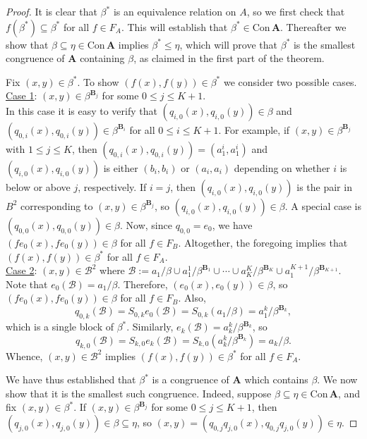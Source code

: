 \documentclass[cm,dissertation]{uhthesis}
\theoremstyle{plain}
\theoremstyle{definition}
\newcounter{claim}
\theoremstyle{remark}
\numberwithin{theorem}{section}
\numberwithin{claim}{chapter}
\numberwithin{equation}{section}
\numberwithin{conjecture}{chapter}
\newcommand{\<}{\ensuremath{\langle}}
\renewcommand{\>}{\ensuremath{\rangle}}
\renewcommand{\leq}{\ensuremath{\leqslant}}
\newcommand{\Con}{\ensuremath{\mathrm{Con\,}}}
\newcommand{\0}{\ensuremath{\mathbf{0}}}
\newcommand{\1}{\ensuremath{\mathbf{1}}}
\newcommand{\2}{\ensuremath{\mathbf{2}}}
\newcommand{\3}{\ensuremath{\mathbf{3}}}
\newcommand{\4}{\ensuremath{\mathbf{4}}}
\newcommand{\5}{\ensuremath{\mathbf{5}}}
\newcommand{\bA}{\ensuremath{\mathbf{A}}}
\newcommand{\bB}{\ensuremath{\mathbf{B}}}
\newcommand{\sB}{\ensuremath{\mathscr{B}}}
\begin{document}
\begin{proof}
  It is clear that $\beta^*$ is an equivalence relation on $A$, so we first
  check that $f(\beta^*)\subseteq 
  \beta^*$ for all $f\in F_A$.  This will establish that $\beta^*\in \Con\bA$.
  Thereafter we show that $\beta \subseteq \eta \in \Con\bA$ implies 
  $\beta^*\leq \eta$, which will prove that $\beta^*$ is the smallest congruence
  of $\bA$ containing $\beta$, as claimed in the first part of the theorem.

  Fix $(x,y) \in \beta^*$.  To show $(f(x), f(y)) \in \beta^*$ we consider two
  possible cases.
  \\[6pt]
  \underline{Case 1}: $(x,y)\in \beta^{\bB_j}$ for some $0\leq j \leq K+1$.\\[4pt]
  In this case it is easy to verify that $(q_{i,0}(x), q_{i,0}(y)) \in \beta$ and 
  $(q_{0,i}(x), q_{0,i}(y)) \in \beta^{\bB_i}$  for all $0\leq i \leq
  K+1$.  For example, if $(x,y)\in \beta^{\bB_j}$ with $1\leq j \leq K$, 
  then $(q_{0,i}(x), q_{0,i}(y))  = (a_1^i, a_1^i)$ %
  and $(q_{i,0}(x), q_{i,0}(y))$ is either $(b_i, b_i)$ or $(a_i,
  a_i)$ depending on whether $i$ is below or above $j$, respectively. If $i=j$,
  then $(q_{i,0}(x), q_{i,0}(y))$ is the pair in $B^2$ corresponding to
  $(x,y)\in \beta^{\bB_j}$, so $(q_{i,0}(x), q_{i,0}(y))\in \beta$.
  A special case is $(q_{0,0}(x), q_{0,0}(y)) \in \beta$.  Now, since 
  $q_{0,0} = e_0$, we have $(f e_{0}(x), f e_{0}(y))\in \beta$
  for all $f\in F_B$.
  Altogether, the foregoing implies that $(f(x),f(y))\in \beta^*$
  for all $f\in F_A$.
  \\[6pt]
  \underline{Case 2}: $(x,y)\in \sB^2$ where 
  $\sB := a_1/\beta \cup a_1^1/\beta^{\bB_1} \cup \cdots \cup a_K^K/\beta^{\bB_K}\cup a_1^{K+1}/\beta^{\bB_{K+1}}$.
  \\[4pt]
  Note that  $e_0(\sB) = a_1/\beta$. Therefore, 
  $(e_0(x),e_0(y)) \in  \beta$, so 
  $(fe_0(x),fe_0(y)) \in  \beta$ for all $f\in F_B$.  Also,
  \[
  q_{0,k}(\sB) = S_{0,k} e_0(\sB) = S_{0,k}(a_1/\beta) = 
  a_1^{k}/\beta^{\bB_{k}},
  \]
  which is a single block of $\beta^*$.
  Similarly,
  $e_k(\sB) = a_k^k/\beta^{\bB_k}$, so 
  \[
  q_{k,0}(\sB) = S_{k,0} e_k(\sB) = S_{k,0}(a_k^k/\beta^{\bB_k}) = a_k/\beta.
  \]
  Whence, $(x,y)\in \sB^2$ implies $(f(x), f(y)) \in \beta^*$ for all $f\in F_A$.

  We have thus established that $\beta^*$ is a congruence of $\bA$ which
  contains $\beta$.  We now show that it is the smallest such congruence.  Indeed,
  suppose $\beta \subseteq \eta \in \Con\bA$, and fix $(x,y)\in \beta^*$.
  If $(x,y)\in \beta^{\bB_j}$ for some $0\leq j \leq K+1$, then 
  $(q_{j,0}(x), q_{j,0}(y))\in \beta \subseteq \eta$, so 
  $(x, y) = (q_{0,j}q_{j,0}(x), q_{0,j}q_{j,0}(y))\in \eta$.


\end{proof}
\end{document}
